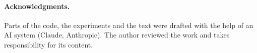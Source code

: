 \documentclass[10pt,twocolumn]{article}
\begin{document}
\paragraph{Acknowledgments.} Parts of the code, the experiments and the text were drafted with the help of an AI system
(Claude, Anthropic). The author reviewed the work and takes responsibility for its content.

{\small}

\clearpage
\onecolumn
\appendix

\end{document}
